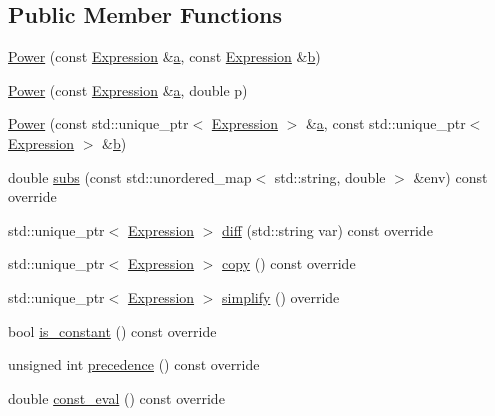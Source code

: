 \subsection*{Public Member Functions}
\begin{DoxyCompactItemize}
\item 
\mbox{\hyperlink{classsymcpp_1_1Power_a2771cf0de9510c3e3d09476504c608f4}{Power}} (const \mbox{\hyperlink{classsymcpp_1_1Expression}{Expression}} \&\mbox{\hyperlink{classsymcpp_1_1Power_aa36a8b5499b378ec9bd705ea9a9e77ce}{a}}, const \mbox{\hyperlink{classsymcpp_1_1Expression}{Expression}} \&\mbox{\hyperlink{classsymcpp_1_1Power_add4b954bcfa942f2d14ed40713d92ad8}{b}})
\item 
\mbox{\hyperlink{classsymcpp_1_1Power_a1d97fafc9c111460aa8690951045f214}{Power}} (const \mbox{\hyperlink{classsymcpp_1_1Expression}{Expression}} \&\mbox{\hyperlink{classsymcpp_1_1Power_aa36a8b5499b378ec9bd705ea9a9e77ce}{a}}, double p)
\item 
\mbox{\hyperlink{classsymcpp_1_1Power_a5c32ae8501d643bbbe846f08563bac44}{Power}} (const std\+::unique\+\_\+ptr$<$ \mbox{\hyperlink{classsymcpp_1_1Expression}{Expression}} $>$ \&\mbox{\hyperlink{classsymcpp_1_1Power_aa36a8b5499b378ec9bd705ea9a9e77ce}{a}}, const std\+::unique\+\_\+ptr$<$ \mbox{\hyperlink{classsymcpp_1_1Expression}{Expression}} $>$ \&\mbox{\hyperlink{classsymcpp_1_1Power_add4b954bcfa942f2d14ed40713d92ad8}{b}})
\item 
double \mbox{\hyperlink{classsymcpp_1_1Power_a0cf64595eca511f6a83317f47754bd58}{subs}} (const std\+::unordered\+\_\+map$<$ std\+::string, double $>$ \&env) const override
\item 
std\+::unique\+\_\+ptr$<$ \mbox{\hyperlink{classsymcpp_1_1Expression}{Expression}} $>$ \mbox{\hyperlink{classsymcpp_1_1Power_ac8fdf5b0ddfa04647ba93a6c383d4a7b}{diff}} (std\+::string var) const override
\item 
std\+::unique\+\_\+ptr$<$ \mbox{\hyperlink{classsymcpp_1_1Expression}{Expression}} $>$ \mbox{\hyperlink{classsymcpp_1_1Power_ac628b9070382bde67b838f291f81ddc4}{copy}} () const override
\item 
std\+::unique\+\_\+ptr$<$ \mbox{\hyperlink{classsymcpp_1_1Expression}{Expression}} $>$ \mbox{\hyperlink{classsymcpp_1_1Power_aa6411b410decc9778640feaa7d173349}{simplify}} () override
\item 
bool \mbox{\hyperlink{classsymcpp_1_1Power_af90cd850099fda788416ab5aa9e752e2}{is\+\_\+constant}} () const override
\item 
unsigned int \mbox{\hyperlink{classsymcpp_1_1Power_a1287f36d506b82695187beae3f3c9a5e}{precedence}} () const override
\item 
double \mbox{\hyperlink{classsymcpp_1_1Power_ac344573e85b3db4a324ba3635244c8ca}{const\+\_\+eval}} () const override
\end{DoxyCompactItemize}
